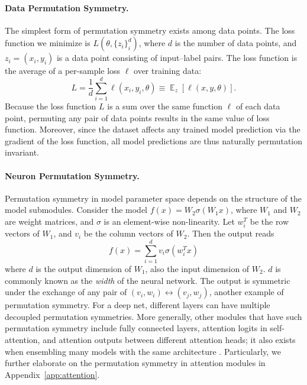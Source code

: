 \documentclass{article}
\theoremstyle{plain}
\newcommand{\E}{\mathop{\mathbb{E}}}
\def\REV#1{{\color[HTML]{000000}#1}}
\begin{document}
\vspace{-2mm}
\paragraph{Data Permutation Symmetry.} The simplest form of permutation symmetry exists among data points. The loss function we minimize is $L (\theta, \{z_i\}_i^d)$, where $d$ is the number of data points, and $z_i=(x_i, y_i)$ is a data point consisting of input--label pairs. The loss function is the average of a per-sample loss $\ell$ over training data:
\begin{equation}
    L = \frac{1}{d}\sum_{i=1}^d\ell(x_i,y_i,\theta) \equiv \E_z[\ell(x,y,\theta)].
\end{equation}
Because the loss function $L$ is a sum over the same function $\ell$ of each data point, permuting any pair of data points results in the same value of loss function. Moreover, since the dataset affects any trained model prediction via the gradient of the loss function, all model predictions are thus naturally permutation invariant. 

\vspace{-2mm}
\paragraph{Neuron Permutation Symmetry.} Permutation symmetry in model parameter space depends on the structure of the model submodules. Consider the model $f(x) = W_2 \sigma( W_1 x )$, where $W_1$ and $W_2$ are weight matrices, and $\sigma$ is an element-wise non-linearity. Let $w_i^T$ be the row vectors of $W_1$, and $v_i$ be the column vectors of $W_2$. Then the output reads
\begin{equation}    \label{eq:NN_output}
    f(x) = \sum_{i=1}^d v_i \sigma( w_i^T x )
\end{equation}
where $d$ is the output dimension of $W_1$, also the input dimension of $W_2$. $d$ is commonly known as the \emph{width} of the neural network. The output is symmetric under the exchange of any pair of $(v_i, w_i) \leftrightarrow (v_j, w_j)$, another example of permutation symmetry. For a deep net, different layers can have multiple decoupled permutation symmetries. More generally, other modules that have such permutation symmetry include fully connected layers, attention logits in self-attention, and attention outputs between different attention heads; it also exists when ensembling many models with the same architecture \citep{brea2019weight, ziyin2025parameter}. \REV{Particularly, we further elaborate on the permutation symmetry in attention modules in Appendix~\ref{app:attention}. }
\end{document}
